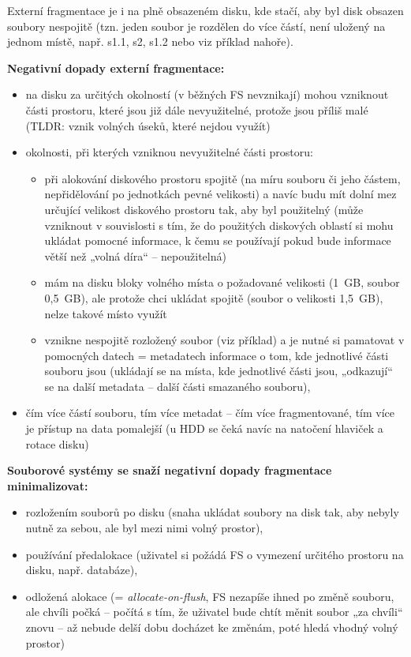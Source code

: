 \documentclass[a4paper, 11pt]{article}
\begin{document}
Externí fragmentace je i na plně obsazeném disku, kde stačí, aby byl disk obsazen soubory nespojitě (tzn. jeden soubor je rozdělen do více částí, není uložený na jednom místě, např. s1.1, s2, s1.2 nebo viz příklad nahoře).

\textbf{Negativní dopady externí fragmentace:}
\begin{itemize}
    \item na disku za určitých okolností (v běžných FS nevznikají) mohou vzniknout části prostoru, které jsou již dále nevyužitelné, protože jsou příliš malé (TLDR: vznik volných úseků, které nejdou využít)
    \item okolnosti, při kterých vzniknou nevyužitelné části prostoru:
    \begin{itemize}
        \item při alokování diskového prostoru spojitě (na míru souboru či jeho částem, nepřidělování po jednotkách pevné velikosti) a navíc budu mít dolní mez určující velikost diskového prostoru tak, aby byl použitelný (může vzniknout v souvislosti s tím, že do použitých diskových oblastí si mohu ukládat pomocné informace, k čemu se používají pokud bude informace větší než „volná díra“ -- nepoužitelná)
        \item mám na disku bloky volného místa o požadované velikosti (1~GB, soubor 0,5~GB), ale protože chci ukládat spojitě (soubor o velikosti 1,5~GB), nelze takové místo využít
        \item vznikne nespojitě rozložený soubor (viz příklad) a je nutné si pamatovat v pomocných datech = metadatech informace o tom, kde jednotlivé části souboru jsou (ukládají se na místa, kde jednotlivé části jsou, „odkazují“ se na další metadata -- další části smazaného souboru),
    \end{itemize}
    \item čím více částí souboru, tím více metadat -- čím více fragmentované, tím více je přístup na data pomalejší (u HDD se čeká navíc na natočení hlaviček a rotace disku)
\end{itemize}
 
\textbf{Souborové systémy se snaží negativní dopady fragmentace minimalizovat:}
\begin{itemize}
 \item rozložením souborů po disku (snaha ukládat soubory na disk tak, aby nebyly nutně za sebou, ale byl mezi nimi volný prostor),
 \item používání předalokace (uživatel si požádá FS o vymezení určitého prostoru na disku, např. databáze),
 \item odložená alokace (= \emph{allocate-on-flush}, FS nezapíše ihned po změně souboru, ale chvíli počká -- počítá s tím, že uživatel bude chtít měnit soubor „za chvíli“ znovu -- až nebude delší dobu docházet ke změnám, poté hledá vhodný volný prostor)
\end{itemize}
\end{document}

